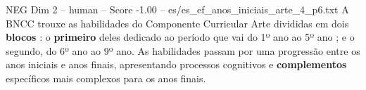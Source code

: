 \begin{textsample}{NEG Dim 2 – human – Score -1.00 – es/es\_ef\_anos\_iniciais\_arte\_4\_p6.txt}  \label{ex:f2_neg_002}
A BNCC trouxe as habilidades do Componente Curricular Arte divididas em dois \textbf{blocos} : o \textbf{primeiro} deles dedicado ao período que vai do 1º ano ao 5º ano ; e o segundo, do 6º ano ao 9º ano.
As habilidades passam por uma progressão entre os anos iniciais e anos finais, apresentando processos cognitivos e \textbf{complementos} específicos mais complexos para os anos finais.

\end{textsample}

